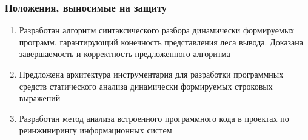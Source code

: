\documentclass{beamer}
\begin{document}
\begin{frame}
    \transwipe[direction=90]
    \frametitle{Положения, выносимые на защиту}
    \begin{enumerate}
        \item Разработан алгоритм синтаксического разбора динамически формируемых программ, гарантирующий конечность представления леса вывода. Доказана завершаемость и корректность предложенного алгоритма
        \item Предложена архитектура инструментария для разработки программных средств статического анализа динамически формируемых строковых выражений
        \item Разработан метод анализа встроенного программного кода в проектах по реинжинирингу информационных систем
    \end{enumerate}
\end{frame}


\end{document}
